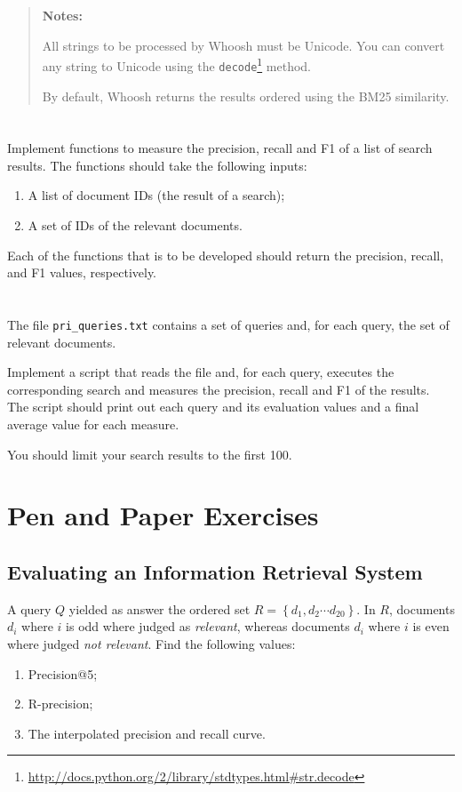 \documentclass[12pt]{article}
\begin{document}
\begin{quote}
    \textbf{Notes:} 

    All strings to be processed by Whoosh must be Unicode. You can convert any
    string to Unicode using the
    \texttt{decode}\footnote{\url{http://docs.python.org/2/library/stdtypes.html\#str.decode}}
    method.

    By default, Whoosh returns the results ordered using the BM25 similarity.
\end{quote}

\section{}

Implement functions to measure the precision, recall and F1 of a list of search
results. The functions should take the following inputs:
\begin{enumerate}
\item A list of document IDs (the result of a search);
\item A set of IDs of the relevant documents.
\end{enumerate}
Each of the functions that is to be developed should return the precision, recall, and F1 values, respectively.

\section{}

The file \texttt{pri\_queries.txt} contains a set of queries and, for each
query, the set of relevant documents.

Implement a script that reads the file and, for each query, executes the
corresponding search and measures the precision, recall and F1 of the
results. The script should print out each query and its evaluation values and a
final average value for each measure.

You should limit your search results to the first 100.

\section{Pen and Paper Exercises}

\subsection{Evaluating an Information Retrieval System}

A query $Q$ yielded as answer the ordered set
$R = \left\{ d_1, d_2 \cdots d_{20} \right\}$. In $R$, documents $d_i$ where
$i$ is odd where judged as \emph{relevant}, whereas documents $d_i$ where $i$
is even where judged \emph{not relevant}. Find the following values:
\begin{enumerate}
\item Precision@5;
\item R-precision;
\item The interpolated precision and recall curve.
\end{enumerate}
\end{document}
